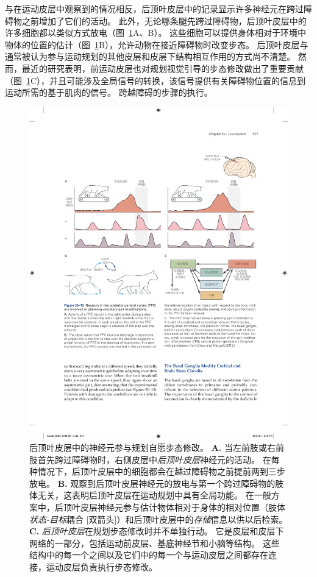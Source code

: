 与在运动皮层中观察到的情况相反，后顶叶皮层中的记录显示许多神经元在跨过障碍物之前增加了它们的活动。
此外，无论哪条腿先跨过障碍物，后顶叶皮层中的许多细胞都以类似方式放电（图~\ref{fig:33_15}A、B）。
这些细胞可以提供身体相对于环境中物体的位置的估计（图~\ref{fig:33_15}B），允许动物在接近障碍物时改变步态。
后顶叶皮层与通常被认为参与运动规划的其他皮层和皮层下结构相互作用的方式尚不清楚。
然而，最近的研究表明，前运动皮层也对规划视觉引导的步态修改做出了重要贡献（图~\ref{fig:33_15}C），并且可能涉及全局信号的转换，该信号提供有关障碍物位置的信息到运动所需的基于肌肉的信号。
跨越障碍的步骤的执行。


\begin{figure}[htbp]
	\centering
	\includegraphics[width=1.0\linewidth]{chap33/fig_33_15}
	\caption{后顶叶皮层中的神经元参与规划自愿步态修改。
		\textbf{A.} 当左前肢或右前肢首先跨过障碍物时，右侧皮层中\textit{后顶叶皮层}神经元的活动。
		在每种情况下，后顶叶皮层中的细胞都会在越过障碍物之前提前两到三步放电。
		\textbf{B.} 观察到后顶叶皮层神经元的放电与第一个跨过障碍物的肢体无关，这表明后顶叶皮层在运动规划中具有全局功能。
		在一般方案中，后顶叶皮层神经元参与估计物体相对于身体的相对位置（肢体\textit{状态-目标}耦合 [双箭头]）和后顶叶皮层中的\textit{存储}信息以供以后检索。
		\textbf{C.} \textit{后顶叶皮层}在规划步态修改时并不单独行动。
		它是皮层和皮层下网络的一部分，包括运动前皮层、基底神经节和小脑等结构。
		这些结构中的每一个之间以及它们中的每一个与运动皮层之间都存在连接，运动皮层负责执行步态修改\cite{drew2015taking}。}
	\label{fig:33_15}
\end{figure}


